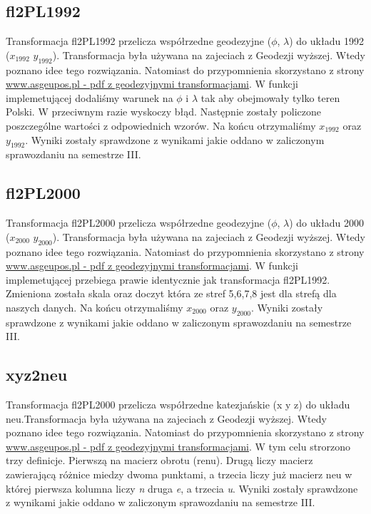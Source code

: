 \subsection{fl2PL1992} 
Transformacja fl2PL1992 przelicza współrzedne geodezyjne ($\phi$, $\lambda$) do układu 1992 ($x_{1992}$ $y_{1992}$). Transformacja była używana na zajeciach z Geodezji wyższej. Wtedy poznano idee tego rozwiązania. Natomiast do przypomnienia skorzystano z strony \href{http://www.asgeupos.pl/index.php?wpg_type=tech_transf&sub=xyz_blh}{www.asgeupos.pl - pdf z geodezyjnymi transformacjami}. W funkcji implemetującej dodaliśmy warunek na $\phi$ i $\lambda$ tak aby obejmowały tylko teren Polski. W przeciwnym razie wyskoczy błąd. Następnie zostały policzone poszczególne wartości z odpowiednich wzorów. Na końcu otrzymaliśmy $x_{1992}$ oraz $y_{1992}$. Wyniki zostały sprawdzone z wynikami jakie oddano w zaliczonym sprawozdaniu na semestrze III.

\subsection{fl2PL2000} 
Transformacja fl2PL2000 przelicza współrzedne geodezyjne ($\phi$, $\lambda$) do układu 2000 ($x_{2000}$ $y_{2000}$). Transformacja była używana na zajeciach z Geodezji wyższej. Wtedy poznano idee tego rozwiązania. Natomiast do przypomnienia skorzystano z strony \href{http://www.asgeupos.pl/index.php?wpg_type=tech_transf&sub=xyz_blh}{www.asgeupos.pl - pdf z geodezyjnymi transformacjami}. W funkcji implemetującej przebiega prawie identycznie jak transformacja fl2PL1992. Zmieniona została skala oraz doczyt która ze stref 5,6,7,8 jest dla strefą dla naszych danych. Na końcu otrzymaliśmy $x_{2000}$ oraz $y_{2000}$. Wyniki zostały sprawdzone z wynikami jakie oddano w zaliczonym sprawozdaniu na semestrze III.

\subsection{xyz2neu} 
Transformacja fl2PL2000 przelicza współrzedne katezjańskie (x y z) do układu neu.Transformacja była używana na zajeciach z Geodezji wyższej. Wtedy poznano idee tego rozwiązania. Natomiast do przypomnienia skorzystano z strony \href{http://www.asgeupos.pl/index.php?wpg_type=tech_transf&sub=xyz_blh}{www.asgeupos.pl - pdf z geodezyjnymi transformacjami}. W tym celu strorzono trzy definicje. Pierwszą na macierz obrotu (renu). Drugą liczy macierz zawierającą różnice miedzy dwoma punktami, a trzecia liczy już macierz neu w której pierwsza kolumna liczy \textit{n} druga \textit{e}, a trzecia \textit{u}. Wyniki zostały sprawdzone z wynikami jakie oddano w zaliczonym sprawozdaniu na semestrze III.

